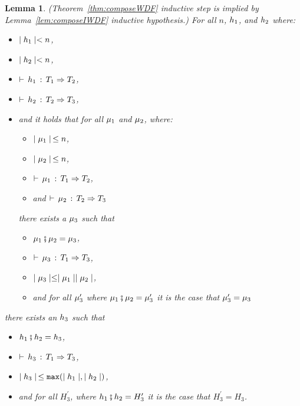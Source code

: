 \documentclass[acmtog, authorversion, acmlarge]{acmart}
\newtheorem{lem}{Lemma}
\begin{document}
\begin{lem}
  \label{lem:thm:help}
  (Theorem~\ref{thm:composeWDF} inductive step is implied by Lemma~\ref{lem:composeIWDF} inductive hypothesis.)
  For all $n$, $h_1$, and $h_2$ where:
  \begin{itemize}
  \item $\mid h_1 \mid < n$,
  \item $\mid h_2 \mid < n$, 
  \item $\vdash \, h_1 \, : \, T_1 \Rightarrow T_2$,
  \item $\vdash \, h_2 \, : \, T_2 \Rightarrow T_3$,
  \item and it holds that for all $\mu_1$ and $\mu_2$, where:
    \begin{itemize}
    \item $\mid \mu_1 \mid \, \le n$,
    \item $\mid \mu_2 \mid \, \le n$,
    \item $\vdash \, \mu_1 \, : \, T_1 \Rightarrow T_2$,
    \item and $\vdash \, \mu_2 \, : \, T_2 \Rightarrow T_3$
    \end{itemize}
    there exists a $\mu_3$ such that
    \begin{itemize}
    \item $\mu_1 \fatsemi \mu_2 = \mu_3$,
    \item $\vdash \, \mu_3 \, : \, T_1 \Rightarrow T_3$,
    \item $\mid \mu_3 \mid \le \mid \mu_1 \mid \mid \mu_2 \mid$,
    \item and for all $\mu_{3}^{\prime}$ where $\mu_1 \fatsemi \mu_2 = \mu_{3}^{\prime}$
      it is the case that $\mu_{3}^{\prime} = \mu_{3}$
    \end{itemize}
  \end{itemize}
  there exists an $h_3$ such that
  \begin{itemize}
  \item $h_1 \fatsemi h_2 = h_3$,
  \item $\vdash \, h_3 \, : \, T_1 \Rightarrow T_3$,
  \item $\mid h_3 \mid \, \le \texttt{max}(\mid h_1 \mid, \mid h_2 \mid)$,
  \item and for all $H_{3}^{\prime}$, where $h_1 \fatsemi h_2 = H_{3}^{\prime}$
    it is the case that $H_{3}^{\prime} = H_{3}$.
  \end{itemize}
\end{lem}
\end{document}

